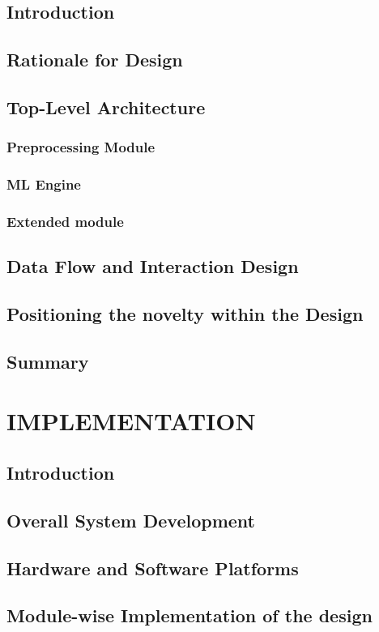 \documentclass[12pt, a4paper]{report}
\begin{document}
\section{Introduction}
\section{Rationale for Design}
\section{Top-Level Architecture}
\subsection{Preprocessing Module}
\subsection{ML Engine}
\subsection{Extended module}
\section{Data Flow and Interaction Design}
\section{Positioning the novelty within the Design}
\section{Summary}

\chapter{IMPLEMENTATION}
\section{Introduction}
\section{Overall System Development}
\section{Hardware and Software Platforms}
\section{Module-wise Implementation of the design}
\end{document}
